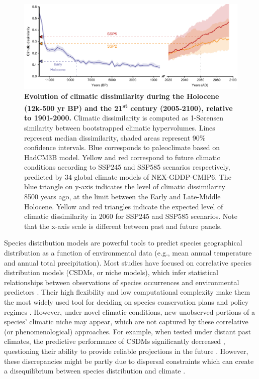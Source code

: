 \begin{figure}[ht!]
\centering
\includegraphics[width=17cm]{chapter2/figs/climatic_dissimilarity.pdf}
\caption{\textbf{Evolution of climatic dissimilarity during the Holocene (12k-500 yr BP) and the 21\textsuperscript{st} century (2005-2100), relative to 1901-2000.} Climatic dissimilarity is computed as 1-Sørensen similarity between bootstrapped climatic hypervolumes. Lines represent median dissimilarity, shaded areas represent 90\% confidence intervals. Blue corresponds to paleoclimate based on HadCM3B model. Yellow and red correspond to future climatic conditions according to SSP245 and SSP585 scenarios respectively, predicted by 34 global climate models of NEX-GDDP-CMIP6. The blue triangle on y-axis indicates the level of climatic dissimilarity 8500 years ago, at the limit between the Early and Late-Middle Holocene. Yellow and red triangles indicate the expected level of climatic dissimilarity in 2060 for SSP245 and SSP585 scenarios. Note that the x-axis scale is different between past and future panels.}
\label{fig:climaticdissimilarity}
\end{figure}

Species distribution models are powerful tools to predict species geographical distribution as a function of environmental data (e.g., mean annual temperature and annual total precipitation). Most studies have focused on correlative species distribution models (CSDMs, or niche models), which infer statistical relationships between observations of species occurrences and environmental predictors \citep{Dormann2012}. Their high flexibility and low computational complexity make them the most widely used tool for deciding on species conservation plans and policy regimes \citep[e.g.][]{Hanewinkel2013}. However, under novel climatic conditions, new unobserved portions of a species’ climatic niche may appear, which are not captured by these correlative (or phenomenological) approaches. For example, when tested under distant past climates, the predictive performance of CSDMs  significantly decreased \citep{Maguire2016}, questioning their ability to provide reliable projections in the future \citep{Fitzpatrick2018}. However, these discrepancies might be partly due to dispersal constraints which can create a disequilibrium between species distribution and climate \citep{Svenning2004}.

